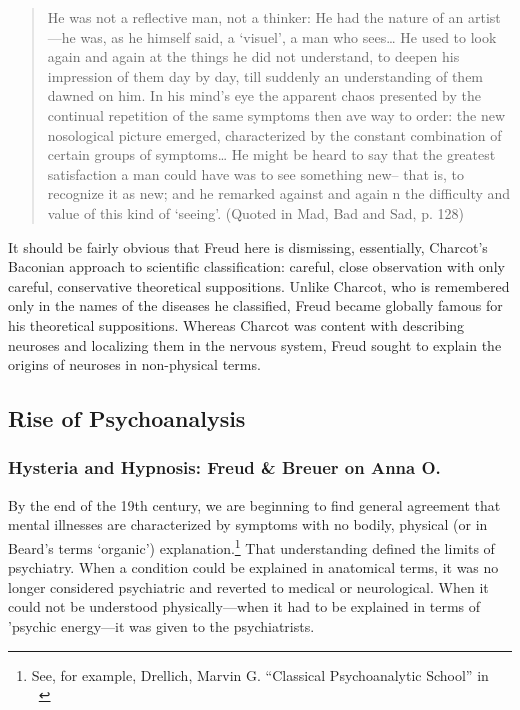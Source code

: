 \begin{refsection}
\begin{quote}
He was not a reflective man, not a thinker: He had the nature of an artist—he was, as he himself said, a `visuel', a man who sees{\ldots} He used to look again and again at the things he did not understand, to deepen his impression of them day by day, till suddenly an understanding of them dawned on him. In his mind's eye the apparent chaos presented by the continual repetition of the same symptoms then ave way to order: the new nosological picture emerged, characterized by the constant combination of certain groups of symptoms{\ldots} He might be heard to say that the greatest satisfaction a man could have was to see something new-- that is, to recognize it as new; and he remarked against and again n the difficulty and value of this kind of `seeing'. (Quoted in Mad, Bad and Sad, p. 128)
\end{quote}

It should be fairly obvious that Freud here is dismissing, essentially, Charcot's Baconian approach to scientific classification: careful, close observation with only careful, conservative theoretical suppositions. Unlike Charcot, who is remembered only in the names of the diseases he classified, Freud became globally famous for his theoretical suppositions. Whereas Charcot was content with describing neuroses and localizing them in the nervous system, Freud sought to explain the origins of neuroses in non-physical terms.

\subsection{Rise of Psychoanalysis}
\label{riseofpsychoanalysis}

\subsubsection{Hysteria and Hypnosis: Freud \& Breuer on Anna O.}
\label{hysteriaandhypnosis:freudbreueronannao.}

By the end of the 19th century, we are beginning to find general agreement that mental illnesses are characterized by symptoms with no bodily, physical (or in Beard's terms `organic') explanation.\footnote{See, for example, Drellich, Marvin G. “Classical Psychoanalytic School” in ~\citep{Arieti:1974tm}} That understanding defined the limits of psychiatry. When a condition could be explained in anatomical terms, it was no longer considered psychiatric and reverted to medical or neurological. When it could not be understood physically---when it had to be explained in terms of 'psychic energy---it was given to the psychiatrists.


\end{refsection}
